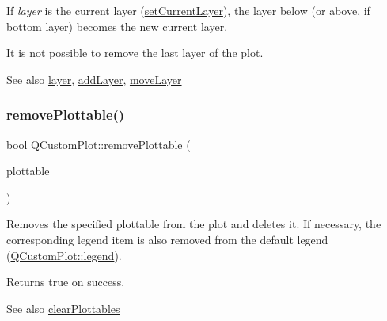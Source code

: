 If {\itshape layer} is the current layer (\mbox{\hyperlink{class_q_custom_plot_a73a6dc47c653bb6f8f030abca5a11852}{set\+Current\+Layer}}), the layer below (or above, if bottom layer) becomes the new current layer.

It is not possible to remove the last layer of the plot.

\begin{DoxySeeAlso}{See also}
\mbox{\hyperlink{class_q_custom_plot_a0a96244e7773b242ef23c32b7bdfb159}{layer}}, \mbox{\hyperlink{class_q_custom_plot_ad5255393df078448bb6ac83fa5db5f52}{add\+Layer}}, \mbox{\hyperlink{class_q_custom_plot_ae896140beff19424e9e9e02d6e331104}{move\+Layer}} 
\end{DoxySeeAlso}
\mbox{\label{class_q_custom_plot_af3dafd56884208474f311d6226513ab2}} 
\subsubsection{\texorpdfstring{remove\+Plottable()}{removePlottable()}\hspace{0.1cm}{\footnotesize\ttfamily [1/2]}}
{\footnotesize\ttfamily bool Q\+Custom\+Plot\+::remove\+Plottable (\begin{DoxyParamCaption}\item[{\mbox{\hyperlink{class_q_c_p_abstract_plottable}{Q\+C\+P\+Abstract\+Plottable}} $\ast$}]{plottable }\end{DoxyParamCaption})}

Removes the specified plottable from the plot and deletes it. If necessary, the corresponding legend item is also removed from the default legend (\mbox{\hyperlink{class_q_custom_plot_a4eadcd237dc6a09938b68b16877fa6af}{Q\+Custom\+Plot\+::legend}}).

Returns true on success.

\begin{DoxySeeAlso}{See also}
\mbox{\hyperlink{class_q_custom_plot_a9a409bb3201878adb7ffba1c89c4e004}{clear\+Plottables}} 
\end{DoxySeeAlso}
\mbox{\label{class_q_custom_plot_afc210e0021480f8119bccf37839dbcc8}} 
